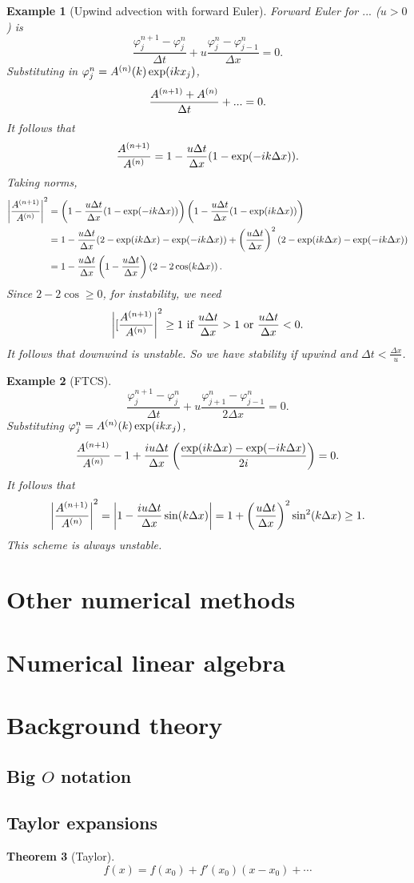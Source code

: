 \documentclass[11pt, a4paper]{article}
\renewcommand{\phi}{\varphi}
\theoremstyle{break}
\newtheorem{thm}{Theorem}[section]
\newtheorem{eg}[thm]{Example}
\newcommand*{\Size}[1]{{\left|#1\right|}}%
\newcommand*{\Paren}[1]{\left(#1\right)}%
\newcommand{\dt}{\Delta t}
\newcommand{\dx}{\Delta x}
\begin{document}
\begin{eg}[Upwind advection with forward Euler]
	Forward Euler for $...$ ($u>0$) is \[\frac{\phi_j^{n+1}-\phi^n_j}{\dt}+u\frac{\phi_j^n-\phi_{j-1}^n}{\dx}=0.\] Substituting in $\phi_j^n=\A{n}(k)\exp(ikx_j)$, \[\frac{\A{n+1}+\A n}{\dt}+...=0.\]
	It follows that \[\frac{\A{n+1}}{\A n}=1-\frac{u\dt}{\dx}(1-\exp(-ik\dx)).\] Taking norms, \begin{align*}\Size{\frac{\A{n+1}}{\A n}}^2&=\Paren{1-\frac{u\dt}{\dx}(1-\exp(-ik\dx))}\Paren{1-\frac{u\dt}{\dx}(1-\exp(ik\dx))}\\
	&= 1-\frac{u\dt}{\dx}(2-\exp(ik\dx)-\exp(-ik\dx))+\Paren{\frac{u\dt}{\dx}}^2(2-\exp(i k\dx)-\exp(-ik\dx))\\&=1-\frac{u\dt}{\dx}\Paren{1-\frac{u\dt}{\dx}}\Paren{2-2\cos(k\dx)}.\end{align*} Since $2-2\cos\geq0$, for instability, we need \[\Size{[\frac{\A{n+1}}{\A n}}^2\geq 1 \text{ if } \frac{u\dt}{\dx}>1 \text{ or } \frac{u\dt}{\dx}<0.\] It follows that downwind is unstable. So we have stability if upwind and $\dt < \frac{\dx}{u}$.
\end{eg}

\begin{eg}[FTCS]

\[\frac{\phi_j^{n+1}-\phi_j^n}{\dt}+u\frac{\phi_{j+1}^n-\phi_{j-1}^n}{2\dx}=0.\]
Substituting $\phi_j^n=\A{n}(k)\exp(ikx_j)$, \[\frac{\A{n+1}}{\A n}-1 +\frac{iu\dt}{\dx}\Paren{\frac{\exp(ik\dx)-\exp(-ik\dx)}{2i}}=0.\] It follows that \[\Size{\frac{\A{n+1}}{\A n}}^2=\Size{1-\frac{iu\dt}{\dx}\sin(k\dx)}=1+\Paren{\frac{u\dt}{\dx}}^2\sin^2(k\dx)\geq 1.\] This scheme is always unstable.
\end{eg}

\section{Other numerical methods}

\section{Numerical linear algebra}\label{sec:numla}


\appendix
\section{Background theory}
\subsection{\texorpdfstring{Big $O$}{Big O} notation}\label{sec:bigO}
\subsection{Taylor expansions}\label{sec:taylor}
\begin{thm}[Taylor]\label{thm:taylor}
	\[f(x)=f(x_0)+f'(x_0)(x-x_0) + \cdots\]
\end{thm}

\nocite{*}



\label{lastpage}
\end{document}
